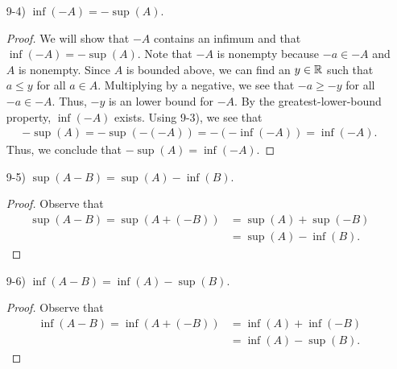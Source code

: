 \documentclass[11pt,a4paper]{article}
\begin{document}
\begin{enumerate}
\begin{enumerate}
\begin{proof}
            Let \( \epsilon > 0 \). Since \( \inf(A)  \) exists, there exists \( \alpha \in A  \) such that   
            \[  \alpha < \inf(A) + \epsilon \]
            by the lemma found in {\hyperref[Problem 3]{Problem 3}}.
            By multiplying by a negative on this inequality, we must have that 
            \[  - \alpha > - \inf(A) - \epsilon \]
            for some \( - \alpha \in -A  \), showing (ii). Thus, we conclude that \( \sup(-A) = -\inf(A)  \).
            \end{proof}
        \item[9-4)] \( \inf(-A) = - \sup(A) \).
            \begin{proof}
    We will show that \( -A  \) contains an infimum and that \( \inf(-A) = - \sup(A) \). Note that \( -A  \) is nonempty because \( -a \in - A  \) and \( A  \) is nonempty. Since \( A  \) is bounded above, we can find an \( y \in \mathbb{R}  \) such that \( a \leq y  \) for all \( a \in A  \). Multiplying by a negative, we see that \( -a \geq -y   \) for all \( -a \in -A  \). Thus, \( -y  \) is an lower bound for \( -A  \). By the greatest-lower-bound property, \( \inf(-A) \) exists. 
            Using 9-3), we see that 
            \begin{align*}
                - \sup (A) = - \sup(-(-A)) = - (- \inf(-A)) = \inf(-A). 
            \end{align*}
            Thus, we conclude that \( - \sup(A) = \inf(-A) \).
            \end{proof}
        \item[9-5)] \( \sup (A -B) = \sup(A) - \inf(B) \).
            \begin{proof}
            Observe that 
            \begin{align*}
                \sup(A - B) = \sup(A + (-B)) &= \sup(A) + \sup(-B) \tag{9-2)} \\
                                             &= \sup(A) - \inf(B). \tag{9-3)}
            \end{align*}
            \end{proof}
        \item[9-6)] \( \inf(A - B) = \inf(A) - \sup(B) \).
            \begin{proof}
            Observe that
            \begin{align*}
                \inf(A -B) = \inf(A + (-B)) &= \inf(A) + \inf(-B) \tag{9-1)} \\
                                            &= \inf(A) - \sup(B). \tag{9-4)}
            \end{align*}

\end{proof}
\end{enumerate}
\end{enumerate}
\end{document}
